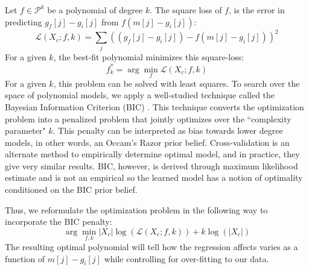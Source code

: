 Let $f\in \mathcal{P}^k$ be a polynomial of degree $k$.
The square loss of $f$, is the error in predicting $g_f[j] - g_i[j]$ from $f(m[j] - g_i[j])$:
\begin{equation}
\mathcal{L}(X_c;f,k) = \sum_j ((g_f[j] - g_i[j]) - f(m[j] - g_i[j]))^2 
\end{equation}
For a given $k$, the best-fit polynomial minimizes this square-loss:
\begin{equation}
f^*_k =\arg \min_f \mathcal{L}(X_c;f,k)
\end{equation}
For a given $k$, this problem can be solved with least squares.
To search over the space of polynomial models, we apply a well-studied technique called the Bayesian Information Criterion (BIC) \cite{schwarz1978estimating,burnham2002model}.
This technique converts the optimization problem into a penalized problem that jointly optimizes over the ``complexity parameter" $k$.
This penalty can be interpreted as bias towards lower degree models, in other words, an Occam's Razor prior belief. 
Cross-validation is an alternate method to empirically determine optimal model, and in practice, they give very similar results.
BIC, however, is derived through maximum likelihood estimate and is not an empirical so the learned model has a notion of optimality conditioned on the BIC prior belief.

Thus, we reformulate the optimization problem in the following way to incorporate the BIC penalty:
\begin{equation}
\arg \min_{f,k} |X_c|\log(\mathcal{L}(X_c;f,k)) + k\log(|X_c|)
\end{equation}
The resulting optimal polynomial will tell how the regression affects varies as a function of $m[j] - g_i[j]$ while controlling for over-fitting to our data.
